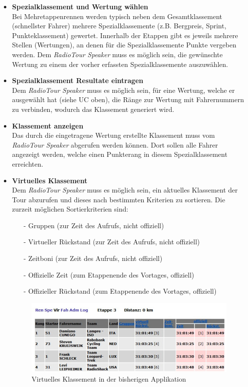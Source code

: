 \begin{itemize}
\item \textbf{Spezialklassement und Wertung wählen}\\
Bei Mehretappenrennen werden typisch neben dem Gesamtklassement (schnellster Fahrer) mehrere Spezialklassemente (z.B. Bergpreis, Sprint, Punkteklassement) gewertet. Innerhalb der Etappen gibt es jeweils mehrere Stellen (Wertungen), an denen für die Spezialklassemente Punkte vergeben werden. Dem \textit{RadioTour Speaker} muss es möglich sein, die gewünschte Wertung zu einem der vorher erfassten Spezialklassemente auszuwählen.

\item \textbf{Spezialklassement Resultate eintragen}\\
Dem \textit{RadioTour Speaker} muss es möglich sein, für eine Wertung, welche er ausgewählt hat (siehe UC oben), die Ränge zur Wertung mit Fahrernummern zu verbinden, wodurch das Klassement generiert wird.

\item \textbf{Klassement anzeigen}\\
Das durch die eingetragene Wertung erstellte Klassement muss vom \textit{RadioTour Speaker} abgerufen werden können. Dort sollen alle Fahrer angezeigt werden, welche einen Punkterang in diesem Spezialklassement erreichten.

\item \textbf{Virtuelles Klassement}\\
Dem \textit{RadioTour Speaker} muss es möglich sein, ein aktuelles Klassement der Tour abzurufen und dieses nach bestimmten Kriterien zu sortieren. Die zurzeit möglichen Sortierkriterien sind:
\begin{itemize}
\item[-]Gruppen (zur Zeit des Aufrufs, nicht offiziell)
\item[-]Virtueller Rückstand (zur Zeit des Aufrufs, nicht offiziell)
\item[-]Zeitboni (zur Zeit des Aufrufs, nicht offiziell)
\item[-]Offizielle Zeit (zum Etappenende des Vortages, offiziell)
\item[-]Offizieller Rückstand (zum Etappenende des Vortages, offiziell)
\end{itemize}

\begin{figure}[h!]
  \caption{Virtuelles Klassement in der bisherigen Applikation}

  \begin{center}
    \includegraphics{05bericht/images/uc05_virtuell.png}
  \end{center}
\end{figure}


\end{itemize}
